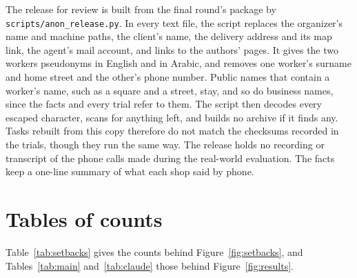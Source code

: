 \documentclass[10pt]{article}
\begin{document}
The release for review is built from the final round's package by \texttt{scripts/anon\_release.py}. In every text file, the script
replaces the organizer's name and machine paths, the client's name, the delivery address and its map link, the agent's mail
account, and links to the authors' pages. It gives the two workers pseudonyms in English and in Arabic, and removes one worker's
surname and home street and the other's phone number. Public names that contain a worker's name, such as a square and a street,
stay, and so do business names, since the facts and every trial refer to them. The script then decodes every escaped character,
scans for anything left, and builds no archive if it finds any. Tasks rebuilt from this copy therefore do not match the checksums
recorded in the trials, though they run the same way. The release holds no recording or transcript of the phone calls made during
the real-world evaluation. The facts keep a one-line summary of what each shop said by phone.
\fi


\section{Tables of counts}
\label{app:tables}

Table~\ref{tab:setbacks} gives the counts behind Figure~\ref{fig:setbacks}, and Tables~\ref{tab:main} and~\ref{tab:claude} those
behind Figure~\ref{fig:results}.
\end{document}
